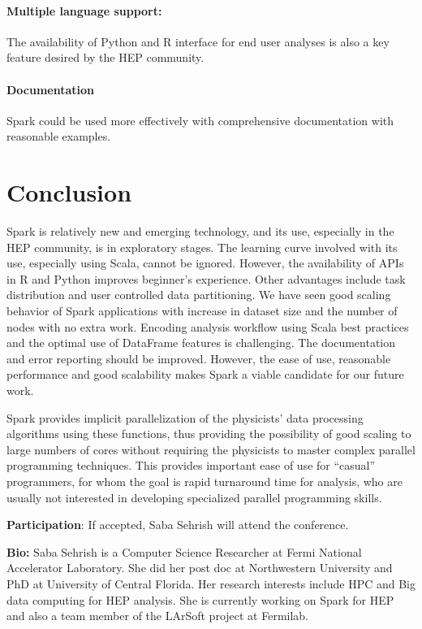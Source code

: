 \documentclass[10pt, twocolumn]{article}
\begin{document}
\paragraph{Multiple language support: }
The availability of Python and R interface for end user analyses is also a key feature desired by the HEP community.


\paragraph{Documentation} 
Spark could be used more effectively with comprehensive documentation with 
reasonable examples. 


\section{Conclusion}
Spark is relatively new and emerging technology, and its use, especially 
in the HEP community, is in exploratory stages. The learning curve involved 
with its use, especially using Scala, cannot be ignored. However, the availability 
of APIs in R and Python improves beginner's experience. 
Other advantages include task distribution and user controlled 
data partitioning. We have seen good scaling behavior of Spark applications 
with increase in dataset size and the number of nodes with no extra work. 
Encoding analysis workflow using Scala best practices and the optimal 
use of DataFrame features is challenging. The documentation 
and error reporting should be improved. However, the ease of use, 
reasonable performance and good scalability makes Spark a viable candidate for our future work.

Spark provides implicit parallelization of the
physicists' data processing algorithms using these functions, thus providing the possibility
of good scaling to large numbers of cores without requiring the
physicists to master complex parallel programming techniques. This
provides important ease of use for ``casual'' programmers, for whom
the goal is rapid turnaround time for analysis, who are usually not
interested in developing specialized parallel programming
skills. 

\textbf{Participation}: If accepted, Saba Sehrish will attend the conference. 

\textbf{Bio:} 
Saba Sehrish is a Computer Science Researcher 
at Fermi National Accelerator Laboratory. She did her post doc at Northwestern University
and PhD at University of Central Florida. 
Her research interests include HPC and Big data computing for HEP analysis.  
She is currently working on Spark for HEP and also a team member of the LArSoft 
project at Fermilab. 
\end{document}
